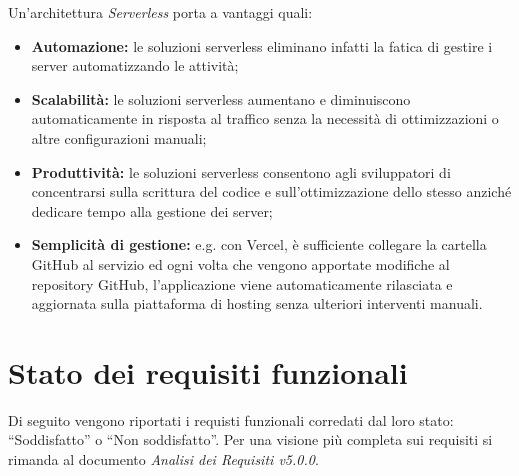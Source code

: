 \noindent Un'architettura \textit{Serverless} porta a vantaggi quali:
\begin{itemize}
    \item \textbf{Automazione:} le soluzioni serverless eliminano infatti la fatica di gestire i server automatizzando le attività;
    \item \textbf{Scalabilità:} le soluzioni serverless aumentano e diminuiscono automaticamente in risposta al traffico senza la necessità di ottimizzazioni o altre configurazioni manuali;
    \item \textbf{Produttività:} le soluzioni serverless consentono agli sviluppatori di concentrarsi sulla scrittura del codice e sull'ottimizzazione dello stesso anziché dedicare tempo alla gestione dei server;
    \item \textbf{Semplicità di gestione:} e.g. con Vercel, è sufficiente collegare la cartella GitHub al servizio ed ogni volta che vengono apportate modifiche al repository GitHub, l'applicazione viene automaticamente rilasciata e aggiornata sulla piattaforma di hosting senza ulteriori interventi manuali.
\end{itemize}


\section{Stato dei requisiti funzionali}\label{sec:requisiti}
Di seguito vengono riportati i requisti funzionali corredati dal loro stato: ``Soddisfatto'' o ``Non soddisfatto''.
Per una visione più completa sui requisiti si rimanda al documento \textit{Analisi dei Requisiti v5.0.0}.

